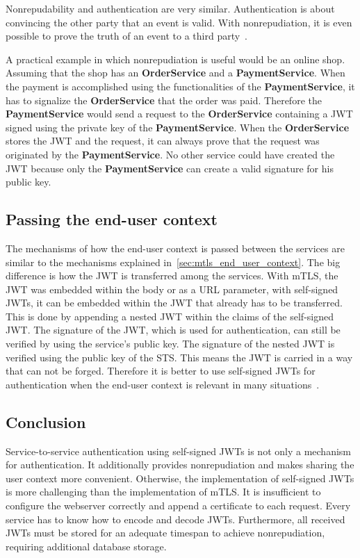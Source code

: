 Nonrepudability and authentication are very similar.
Authentication is about convincing the other party that an event is valid.
With nonrepudiation, it is even possible to prove the truth of an event to a third party~\cite{wu20131200}.

A practical example in which nonrepudiation is useful would be an online shop.
Assuming that the shop has an \textbf{OrderService} and a \textbf{PaymentService}.
When the payment is accomplished using the functionalities of the \textbf{PaymentService}, it has to signalize the \textbf{OrderService} that the order was paid.
Therefore the \textbf{PaymentService} would send a request to the \textbf{OrderService} containing a JWT signed using the private key of the \textbf{PaymentService}.
When the \textbf{OrderService} stores the JWT and the request, it can always prove that the request was originated by the \textbf{PaymentService}.
No other service could have created the JWT because only the \textbf{PaymentService} can create a valid signature for his public key.

\subsection{Passing the end-user context}
The mechanisms of how the end-user context is passed between the services are similar to the mechanisms explained in~\ref{sec:mtls_end_user_context}.
The big difference is how the JWT is transferred among the services.
With mTLS, the JWT was embedded within the body or as a URL parameter, with self-signed JWTs, it can be embedded within the JWT that already has to be transferred.
This is done by appending a nested JWT within the claims of the self-signed JWT.
The signature of the JWT, which is used for authentication, can still be verified by using the service's public key.
The signature of the nested JWT is verified using the public key of the STS.
This means the JWT is carried in a way that can not be forged.
Therefore it is better to use self-signed JWTs for authentication when the end-user context is relevant in many situations~\cite{dias2020microservices}.

\subsection{Conclusion}
Service-to-service authentication using self-signed JWTs is not only a mechanism for authentication. It additionally provides nonrepudiation and makes sharing the user context more convenient. 
Otherwise, the implementation of self-signed JWTs is more challenging than the implementation of mTLS.
It is insufficient to configure the webserver correctly and append a certificate to each request.
Every service has to know how to encode and decode JWTs.
Furthermore, all received JWTs must be stored for an adequate timespan to achieve nonrepudiation, requiring additional database storage.

